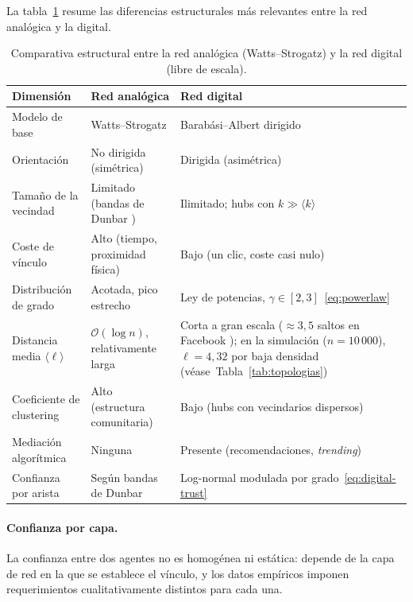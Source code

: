 La tabla~\ref{tab:analog-digital} resume las diferencias estructurales más relevantes entre la red analógica y la digital.

\begin{table}[h!]
  \caption{Comparativa estructural entre la red analógica (Watts–Strogatz) y la red digital (libre de escala).}
  \label{tab:analog-digital}
  \centering
  \begin{tabular}{@{}l p{5cm} p{5.8cm}@{}}
    \toprule
    \textbf{Dimensión} & \textbf{Red analógica} & \textbf{Red digital} \\
    \midrule
    Modelo de base      & Watts–Strogatz & Barabási–Albert dirigido \cite{Bollobas2003} \\
    Orientación         & No dirigida (simétrica) & Dirigida (asimétrica) \\
    Tamaño de la vecindad & Limitado (bandas de Dunbar \cite{Dunbar1992}) & Ilimitado; hubs con $k \gg \langle k \rangle$ \\
    Coste de vínculo    & Alto (tiempo, proximidad física) & Bajo (un clic, coste casi nulo) \\
    Distribución de grado & Acotada, pico estrecho & Ley de potencias, $\gamma \in [2,3]$~\eqref{eq:powerlaw} \\
    Distancia media $\langle \ell \rangle$ & $\mathcal{O}(\log n)$, relativamente larga & Corta a gran escala ($\approx 3{,}5$ saltos en Facebook \cite{Backstrom2012}); en la simulación ($n{=}10\,000$), $\ell{=}4{,}32$ por baja densidad \mbox{(véase Tabla~\ref{tab:topologias})} \\
    Coeficiente de clustering & Alto (estructura comunitaria) & Bajo (hubs con vecindarios dispersos) \\
    Mediación algorítmica & Ninguna & Presente (recomendaciones, \emph{trending}) \\
    Confianza por arista & Según bandas de Dunbar & Log-normal modulada por grado~\eqref{eq:digital-trust} \\
    \bottomrule
  \end{tabular}
\end{table}

\paragraph{Confianza por capa.}
La confianza entre dos agentes no es homogénea ni estática: depende de la capa de red en la que se establece el vínculo, y los datos empíricos imponen requerimientos cualitativamente distintos para cada una.

